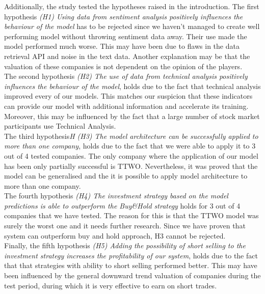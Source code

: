 \documentclass[11pt]{article} %
\begin{document}
Additionally, the study tested the hypotheses raised in the introduction. The first hypothesis \textit{(H1) Using data from sentiment analysis positively influences the behaviour of the model} has to be rejected since we haven't managed to create well performing model without throwing sentiment data away. Their use made the model performed much worse. This may have been due to flaws in the data retrieval API and noise in the text data. Another explanation may be that the valuation of these companies is not dependent on the opinion of the players. \\

The second hypothesis\textit{ (H2) The use of data from technical analysis positively influences the behaviour of the model}, holds due to the fact that technical analysis improved every of our models. This matches our suspicion that these indicators can provide our model with additional information and accelerate its training. Moreover, this may be influenced by the fact that a large number of stock market participants use Technical Analysis.\\

The third hypothesis\textit{H (H3) The model architecture can be successfully applied to more than one company}, holds due to the fact that we were able to apply it to 3 out of 4 tested companies. The only company where the application of our model has been only partially successful is TTWO. Nevertheless, it was proved that the model can be generalised and the it is possible to apply model architecture to more than one company.\\

The fourth hypothesis\textit{ (H4) The investment strategy based on the model predictions is able to outperform the Buy\&Hold strategy} holds for 3 out of 4 companies that we have tested. The reason for this is that the TTWO model was surely the worst one and it needs further research. Since we have proven that system can outperform buy and hold approach, H3 cannot be rejected.\\

Finally, the fifth hypothesis\textit{ (H5) Adding the possibility of short selling to the investment strategy increases the profitability of our system}, holds due to the fact that that strategies with ability to short selling performed better.  This may have been influenced by the general downward trend valuation of companies during the test period, during which it is very effective to earn on short trades.\\
\end{document}
